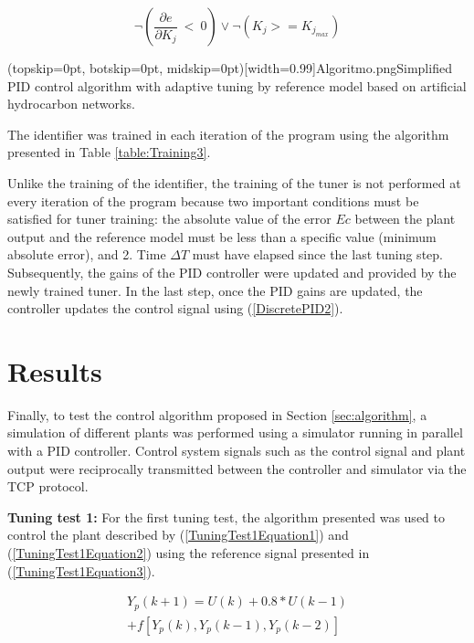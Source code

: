 \documentclass{ieeeaccess}
\begin{document}
\begin{equation}\label{TuningCondition}
    \lnot\left(\frac{\partial e}{\partial K_j}\ <\ 0\right)\vee\lnot\left(K_j>=K_{j_{max}}\right)
\end{equation}

\Figure[ht!](topskip=0pt, botskip=0pt, midskip=0pt)[width=0.99\columnwidth]{Algoritmo.png}{Simplified PID control algorithm with adaptive tuning by reference model based on artificial hydrocarbon networks\label{fig:SimplifiedAlgorithm}.}

The identifier was trained in each iteration of the program using the algorithm presented in Table \ref{table:Training3}.

Unlike the training of the identifier, the training of the tuner is not performed at every iteration of the program because two important conditions must be satisfied for tuner training: the absolute value of the error \(Ec\) between the plant output and the reference model must be less than a specific value (minimum absolute error), and 2. Time \(\Delta T\) must have elapsed since the last tuning step. Subsequently, the gains of the PID controller were updated and provided by the newly trained tuner. In the last step, once the PID gains are updated, the controller updates the control signal using (\ref{DiscretePID2}).

\section{Results}
\label{sec:results}

Finally, to test the control algorithm proposed in Section \ref{sec:algorithm}, a simulation of different plants was performed using a simulator running in parallel with a PID controller. Control system signals such as the control signal and plant output were reciprocally transmitted between the controller and simulator via the TCP protocol.

\textbf{Tuning test 1:} For the first tuning test, the algorithm presented was used to control the plant described by (\ref{TuningTest1Equation1}) and (\ref{TuningTest1Equation2}) using the reference signal presented in (\ref{TuningTest1Equation3}).

\begin{equation}\label{TuningTest1Equation1}
\begin{matrix}
Y_p\left(k+1\right)=U\left(k\right)+0.8\ast U\left(k-1\right)\\
+f\left[Y_p\left(k\right),Y_p\left(k-1\right),Y_p\left(k-2\right)\right]
\end{matrix}
\end{equation}
\end{document}
